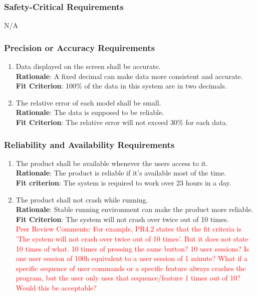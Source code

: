 \documentclass{article}
\begin{document}
\subsubsection{Safety-Critical Requirements}
N/A
\subsubsection{Precision or Accuracy Requirements}
\begin{enumerate}[PR3.1]
    \item Data displayed on the screen shall be accurate.\\
    \textbf{Rationale}: A fixed decimal can make data more consistent and accurate.\\
    \textbf{Fit Criterion}: 100\% of the data in this system are in two decimals.
    
    \item The relative error of each model shall be small.\\
    \textbf{Rationale}: The data is supposed to be reliable.\\
    \textbf{Fit Criterion}: The relative error will not exceed 30\% for each data.
\end{enumerate}
\subsubsection{Reliability and Availability Requirements}
\begin{enumerate}[PR4.1]
    \item The product shall be available whenever the users access to it.\\
    \textbf{Rationale}: The product is reliable if it's available most of the time.\\
    \textbf{Fit criterion}: The system is required to work over 23 hours in a day.
    
    \item The product shall not crash while running.\\
    \textbf{Rationale}: Stable running environment can make the product more reliable.\\
    \textbf{Fit Criterion}: The system will not crash over twice out of 10 times.\\
    \textcolor{red}{Peer Review Comments: For example, PR4.2 states that the fit criteria is 'The
     system will not crash over twice out of 10 times'.
	But it does not state 10 times of what. 10 times of pressing the same button? 10 user sessions?
	Is one user session of 100h equivalent to a user session of 1 minute?
	What if a specific sequence of user commands or a specific feature always crashes the program, but
	 the user only uses that sequence/feature 1 times out of 10? Would this be acceptable?}
\end{enumerate}
\end{document}
